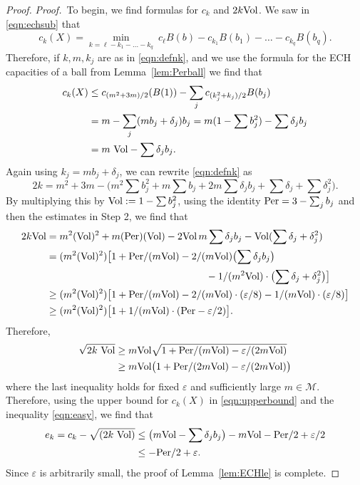 \documentclass[11pt, reqno]{amsart}
\theoremstyle{remark}
\numberwithin{equation}{subsection}
\numberwithin{figure}{section}
\theoremstyle{customremark}
\newcommand{\Vol}{{\rm Vol}}
\newcommand{\Per}{{\rm Per}}
\newcommand{\NI}{{\noindent}}
\newcommand{\Mm}{{\mathcal M}}
\newcommand{\de}{{\delta}}
\newcommand{\eps}{\varepsilon}
\begin{document}
\begin{proof}
\NI {\it Proof.}\
To begin, we find formulas for $c_k$ and $2k \Vol$.
We
 saw in \eqref{eqn:echsub}  that
\begin{equation}
\label{eqn:echsub0}
c_k(X) = \min_{k = \ell - k_1 - \ldots - k_q}\ c_\ell B(b) - c_{k_1} B(b_1) - \ldots - c_{k_q} B(b_q).
\end{equation}
Therefore, if $k,m,k_j$ are as in \eqref{eqn:defnk}, and we use 
 the formula for the ECH capacities of a ball from Lemma~\ref{lem:Perball} we find that
\begin{align}
\label{eqn:upperbound}
c_k(X) &\le c_{(m^2 + 3m)/2}(B(1)) - \sum_j c_{ (k_j^2 + k_j)/2} B(b_j)\\ \notag
 & = m - \sum_j (m b_j+ \delta_j) b_j 
 = m(1 - \sum b_j^2) - \sum \delta_j b_j \\  \notag
 &= m\ \Vol - \sum \delta_j b_j.
\end{align}
Again using $k_j = m b_j+ \delta_j$, we can rewrite \eqref{eqn:defnk} as
\[ 
2k = m^2 + 3m - \bigl(m^2 \sum  b_j^2 + m \sum b_j + 2m \sum \delta_j b_j + \sum \delta_j + \sum \delta_j^2\bigr).\]
By multiplying this by $\Vol: = 1-\sum b_j^2$, using the identity $ \Per = 3- \sum_j b_j$ and then the estimates in Step 2,  we find that
\begin{align*}\notag 2k\Vol &= m^2 (\Vol)^2 + m (\Per)(\Vol) - 2\Vol \, m \sum \delta_j b_j - \Vol( \sum \delta_j + \delta_j^2)
\\ 
&= (m^2(\Vol)^2)\bigl[ 1 + \Per/(m\Vol) - 2/(m\Vol) \bigl(\sum \delta_j b_j\bigr)\\
&\notag\qquad\qquad  \qquad\qquad \qquad\qquad\qquad\qquad   - 1/(m^2\Vol)\cdot \bigl( \sum \delta_j + \delta_j^2\bigr) \bigr]\\ \notag
& \ge (m^2(\Vol)^2)\bigl[ 1 + \Per/(m\Vol) - 2/(m\Vol)\cdot ( \eps/8) - 1/(m\Vol)\cdot (\eps/8)\bigr] \\ \notag
& \ge (m^2(\Vol)^2)\bigl[ 1 + 1/(m\Vol)\cdot (\Per -  \eps/2)\bigr].
\end{align*}
Therefore, 
\begin{align*}
\sqrt{2k\ \Vol} &\ge m\Vol \sqrt {1 + \Per/(m\Vol) - \eps/(2m\Vol)}\\
&  \ge m\Vol\bigl(1 +  \Per/(2m\Vol) - \eps/(2m\Vol)\bigr)
\end{align*}
where the last inequality holds for fixed $\eps$ and sufficiently large $m\in \Mm$.
Therefore, using the upper bound for $c_k(X)$ in \eqref{eqn:upperbound} and the inequality
\eqref{eqn:easy}, we find that
\begin{align*} e_k  = c_k - \sqrt{(2k\ \Vol)} &\le \bigl(m\Vol  - \sum \de_j b_j \bigr) - m\Vol - \Per/2 + \eps/2   \\
& \le  - \Per/2 + \eps.
\end{align*}
Since $\eps$ is arbitrarily small,  the proof of Lemma~\ref{lem:ECHle}  is complete.
\end{proof}
\end{document}
